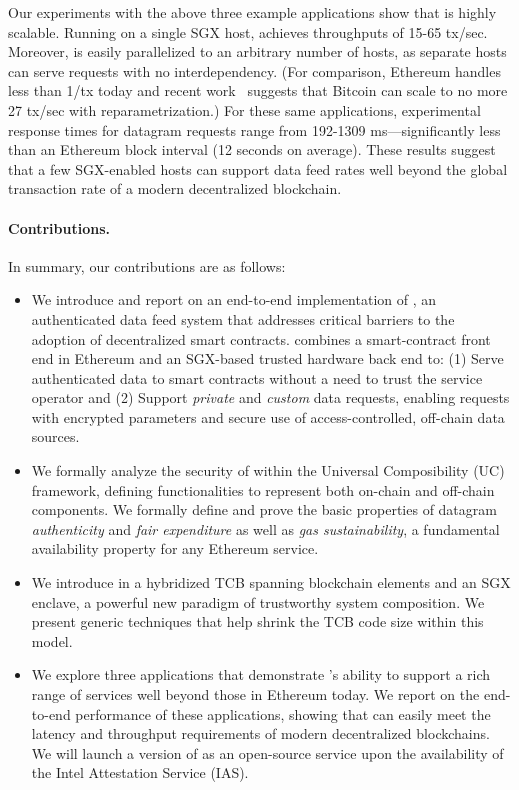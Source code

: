 Our experiments with the above three example applications show that \tc is highly scalable. Running on a single SGX host, \tc achieves throughputs of 15-65 tx/sec. Moreover, \tc is easily parallelized to an arbitrary number of hosts, as separate \tc hosts can serve requests with no interdependency. (For comparison, Ethereum handles less than 1/tx today and recent work~\cite{} suggests that Bitcoin can scale to no more 27 tx/sec with reparametrization.) For these same applications, experimental response times for datagram requests range from 192-1309 ms---significantly less than an Ethereum block interval (12 seconds on average). These results suggest that a few SGX-enabled hosts can support \tc data feed rates well beyond the global transaction rate of a modern decentralized blockchain.

\paragraph{\bf Contributions.}
In summary, our contributions are as follows:
\begin{itemize}[leftmargin=5mm]
\item
  \setlength{\itemsep}{2pt}
  \setlength{\parskip}{0pt}
  \setlength{\parsep}{0pt}
We introduce and report on an end-to-end implementation of \tcs, an authenticated data feed system that addresses critical barriers to the adoption of decentralized smart contracts. \tc combines a smart-contract front end in Ethereum and an SGX-based trusted hardware back end to: (1) Serve authenticated data to smart contracts without a need to trust the \tc service operator and (2) Support {\em private} and {\em custom} data requests, enabling requests with encrypted parameters and secure use of access-controlled, off-chain data sources. 
\item We formally analyze the security of \tc within the Universal Composibility (UC) framework, defining functionalities to represent both on-chain and off-chain components. We formally define and prove the basic properties of datagram {\em authenticity} and {\em fair expenditure} as well as {\em gas sustainability}, a fundamental availability property for any Ethereum service. 
\item We introduce in \tc a hybridized TCB spanning blockchain elements and an SGX enclave, a powerful new paradigm of trustworthy system composition. We present generic techniques that help shrink the TCB code size within this model. 
\item We explore three \tc applications that demonstrate \tc's ability to support a rich range of services well beyond those in Ethereum today. We report on the end-to-end performance of these applications, showing that \tc can easily meet the latency and throughput requirements of modern decentralized blockchains. We will launch a version of \tc as an open-source service upon the availability of the Intel Attestation Service (IAS).

\end{itemize}

